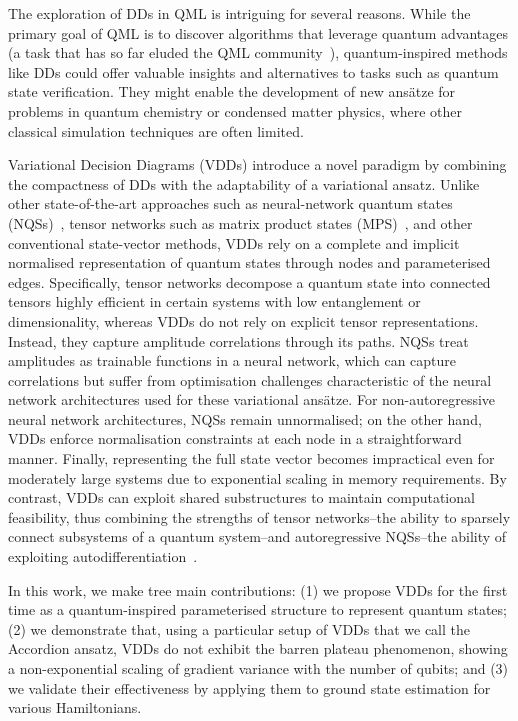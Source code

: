 \documentclass{ieeeaccess}
\begin{document}
The exploration of DDs in QML is intriguing for several reasons.
While the primary goal of QML is to discover algorithms that leverage quantum advantages (a task that has so far eluded the QML community~\cite{gilfuster2024relationtrainabilitydequantizationvariational,bermejo2024quantumconvolutionalneuralnetworks}), quantum-inspired methods like DDs could offer valuable insights and alternatives to tasks such as quantum state verification.
They might enable the development of new ansätze for problems in quantum chemistry or condensed matter physics, where other classical simulation techniques are often limited.

Variational Decision Diagrams (VDDs) introduce a novel paradigm by combining the compactness of DDs with the adaptability of a variational ansatz.
Unlike other state-of-the-art approaches such as neural-network quantum states (NQSs)~\cite{carleo2017solving}, tensor networks such as matrix product states (MPS)~\cite{verstraete2008matrix,orus2014tensornetworks,schollwock2011mps}, and other conventional state-vector methods, VDDs rely on a complete and implicit normalised representation of quantum states through nodes and parameterised edges.
Specifically, tensor networks decompose a quantum state into connected tensors highly efficient in certain systems with low entanglement or dimensionality, whereas VDDs do not rely on explicit tensor representations.
Instead, they capture amplitude correlations through its paths.
NQSs \cite{vivas2022nqs} treat amplitudes as trainable functions in a neural network, which can capture correlations but suffer from optimisation challenges characteristic of the neural network architectures used for these variational ansätze.
For non-autoregressive neural network architectures, NQSs remain unnormalised; on the other hand, VDDs enforce normalisation constraints at each node in a straightforward manner.
Finally, representing the full state vector becomes impractical even for moderately large systems due to exponential scaling in memory requirements.
By contrast, VDDs can exploit shared substructures to maintain computational feasibility, thus combining the strengths of tensor networks--the ability to sparsely connect subsystems of a quantum system--and autoregressive NQSs--the ability of exploiting autodifferentiation~\cite{sharir2020deepautoregressive}.

In this work, we make tree main contributions: (1) we propose VDDs for the first time as a quantum-inspired parameterised structure to represent quantum states; (2) we demonstrate that, using a particular setup of VDDs that we call the Accordion ansatz, VDDs do not exhibit the barren plateau phenomenon, showing a non-exponential scaling of gradient variance with the number of qubits; and (3) we validate their effectiveness by applying them to ground state estimation for various Hamiltonians.
\end{document}
